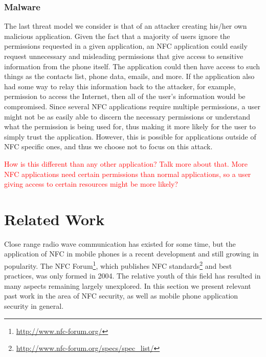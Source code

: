 \documentclass[12pt]{article}
\newcommand\TODO[1]{\textcolor{red}{#1}}
\begin{document}
\subsubsection{Malware}
The last threat model we consider is that of an attacker creating his/her own malicious application. Given the fact that a majority of users ignore the permissions requested in a given application, an NFC application could easily request unnecessary and misleading permissions that give access to sensitive information from the phone itself. The application could then have access to such things as the contacts list, phone data, emails, and more. If the application also had some way to relay this information back to the attacker, for example, permission to access the Internet, then all of the user's information would be compromised. Since several NFC applications require multiple permissions, a user might not be as easily able to discern the necessary permissions or understand what the permission is being used for, thus making it more likely for the user to simply trust the application. However, this is possible for applications outside of NFC specific ones, and thus we choose not to focus on this attack. 

\TODO{How is this different than any other application? Talk more about that. More NFC applications need certain permissions than normal applications, so a user giving access to certain resources might be more likely?}


\section{Related Work}
Close range radio wave communication has existed for some time, but the application of NFC in mobile phones is a recent development and still growing in popularity.
The NFC Forum\footnote{\url{http://www.nfc-forum.org/}}, which publishes NFC standards\footnote{\url{http://www.nfc-forum.org/specs/spec_list/}} and best practices, was only formed in 2004.
The relative youth of this field has resulted in many aspects remaining largely unexplored.
In this section we present relevant past work in the area of NFC security, as well as mobile phone application security in general.
\end{document}
